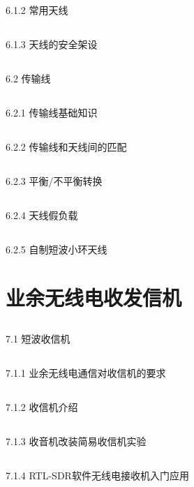 \documentclass[12pt,UTF8]{ctexbook}
\begin{document}
\section{}6.1.2 常用天线
\section{}6.1.3 天线的安全架设
\section{}6.2 传输线
\section{}6.2.1 传输线基础知识
\section{}6.2.2 传输线和天线间的匹配
\section{}6.2.3 平衡/不平衡转换
\section{}6.2.4 天线假负载
\section{}6.2.5 自制短波小环天线

\chapter{业余无线电收发信机}

\section{}7.1 短波收信机
\section{}7.1.1 业余无线电通信对收信机的要求
\section{}7.1.2 收信机介绍
\section{}7.1.3 收音机改装简易收信机实验
\section{}7.1.4 RTL-SDR软件无线电接收机入门应用
\end{document}
